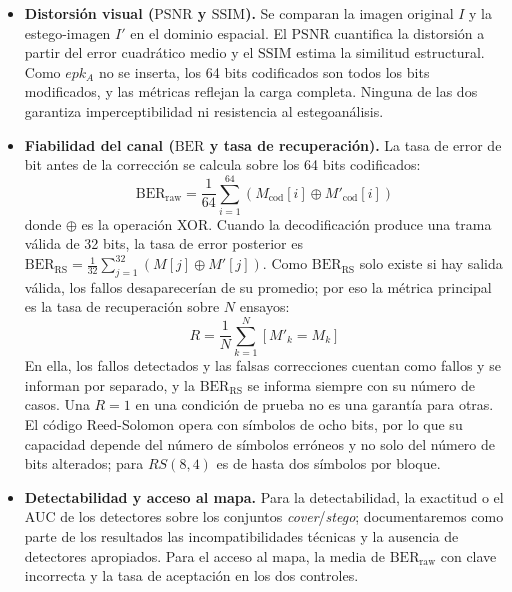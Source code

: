 \documentclass[IB]{TFUOC}%
\begin{document}
\begin{itemize}
    \item \textbf{Distorsión visual ($\mathrm{PSNR}$ y $\mathrm{SSIM}$).} Se comparan la imagen original $I$ y la estego-imagen $I'$ en el dominio espacial. El $\mathrm{PSNR}$ cuantifica la distorsión a partir del error cuadrático medio y el $\mathrm{SSIM}$ estima la similitud estructural. Como $epk_A$ no se inserta, los 64 bits codificados son todos los bits modificados, y las métricas reflejan la carga completa. Ninguna de las dos garantiza imperceptibilidad ni resistencia al estegoanálisis.

    \item \textbf{Fiabilidad del canal ($\mathrm{BER}$ y tasa de recuperación).} La tasa de error de bit antes de la corrección se calcula sobre los 64 bits codificados:
    \begin{equation}
    \mathrm{BER}_{\mathrm{raw}} = \frac{1}{64}\sum_{i=1}^{64}\left( M_{\mathrm{cod}}[i] \oplus M'_{\mathrm{cod}}[i] \right)
    \end{equation}
    donde $\oplus$ es la operación XOR. Cuando la decodificación produce una trama válida de 32 bits, la tasa de error posterior es $\mathrm{BER}_{\mathrm{RS}}=\frac{1}{32}\sum_{j=1}^{32}\left( M[j] \oplus M'[j] \right)$. Como $\mathrm{BER}_{\mathrm{RS}}$ solo existe si hay salida válida, los fallos desaparecerían de su promedio; por eso la métrica principal es la tasa de recuperación sobre $N$ ensayos:
    \begin{equation}
    R = \frac{1}{N}\sum_{k=1}^{N} \left[ M'_k = M_k \right]
    \end{equation}
    En ella, los fallos detectados y las falsas correcciones cuentan como fallos y se informan por separado, y la $\mathrm{BER}_{\mathrm{RS}}$ se informa siempre con su número de casos. Una $R=1$ en una condición de prueba no es una garantía para otras. El código Reed-Solomon opera con símbolos de ocho bits, por lo que su capacidad depende del número de símbolos erróneos y no solo del número de bits alterados; para $RS(8,4)$ es de hasta dos símbolos por bloque.

    \item \textbf{Detectabilidad y acceso al mapa.} Para la detectabilidad, la exactitud o el AUC de los detectores sobre los conjuntos \textit{cover}/\textit{stego}; documentaremos como parte de los resultados las incompatibilidades técnicas y la ausencia de detectores apropiados. Para el acceso al mapa, la media de $\mathrm{BER}_{\mathrm{raw}}$ con clave incorrecta y la tasa de aceptación en los dos controles.
\end{itemize}
\end{document}

